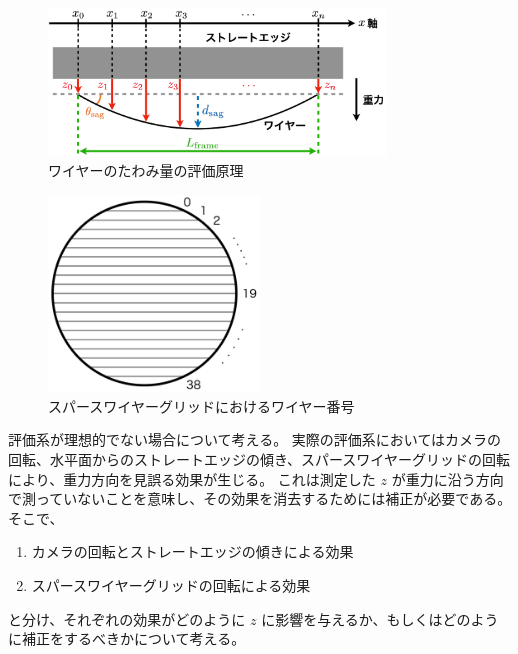 \documentclass[../../main.tex]{subfiles}
\begin{document}
\begin{figure}[H]
    \centering
    \includegraphics[width=0.8\textwidth]{wiresag/wiresag_concept.pdf}
    \caption{ワイヤーのたわみ量の評価原理}
    \label{fig:wiresag_concept}
\end{figure}
\begin{figure}[H]
    \centering
    \includegraphics[width=0.5\textwidth]{wiresag/wire_number.pdf}
    \caption{スパースワイヤーグリッドにおけるワイヤー番号}
    \label{fig:wire_number}
\end{figure}

評価系が理想的でない場合について考える。
実際の評価系においてはカメラの回転、水平面からのストレートエッジの傾き、スパースワイヤーグリッドの回転により、重力方向を見誤る効果が生じる。
これは測定した $z$ が重力に沿う方向で測っていないことを意味し、その効果を消去するためには補正が必要である。
そこで、
\begin{enumerate}
    \item カメラの回転とストレートエッジの傾きによる効果
    \item スパースワイヤーグリッドの回転による効果
\end{enumerate}
と分け、それぞれの効果がどのように $z$ に影響を与えるか、もしくはどのように補正をするべきかについて考える。
\end{document}
